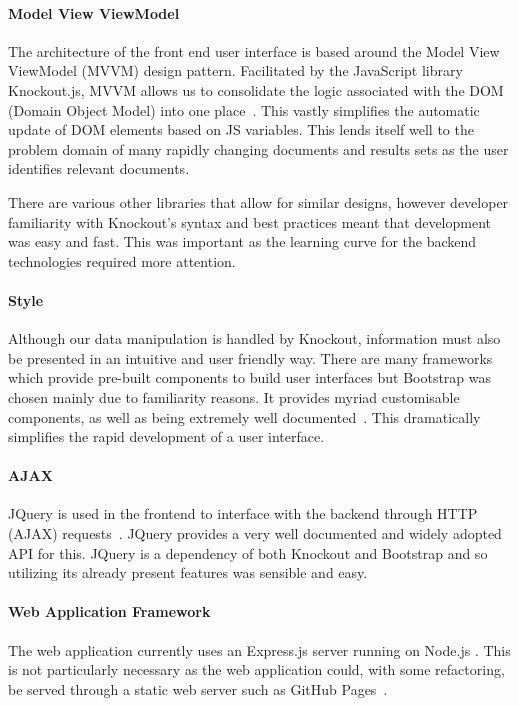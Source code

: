 \documentclass{l4proj}
\begin{document}
\paragraph{Model View ViewModel}
The architecture of the front end user interface is based around the Model View ViewModel (MVVM) design pattern. Facilitated by the JavaScript library Knockout.js, MVVM allows us to consolidate the logic associated with the DOM (Domain Object Model) into one place~\cite{knockout}.
This vastly simplifies the automatic update of DOM elements based on JS variables.
This lends itself well to the problem domain of many rapidly changing documents and results sets as the user identifies relevant documents.

There are various other libraries that allow for similar designs, however developer familiarity with Knockout's syntax and best practices meant that development was easy and fast.
This was important as the learning curve for the backend technologies required more attention.

\paragraph{Style}
Although our data manipulation is handled by Knockout, information must also be presented in an intuitive and user friendly way. There are many frameworks which provide pre-built components to build user interfaces but Bootstrap was chosen mainly due to familiarity reasons. It provides myriad customisable components, as well as being extremely well documented~\cite{bootstrap}. This dramatically simplifies the rapid development of a user interface.

\paragraph{AJAX}
JQuery is used in the frontend to interface with the backend through HTTP (AJAX) requests~\cite{jquery}. JQuery provides a very well documented and widely adopted API for this. JQuery is a dependency of both Knockout and Bootstrap and so utilizing its already present features was sensible and easy.

\paragraph{Web Application Framework}
The web application currently uses an Express.js server running on Node.js \cite{express,node}. This is not particularly necessary as the web application could, with some refactoring, be served through a static web server such as GitHub Pages~\cite{githubpages}.
\end{document}
